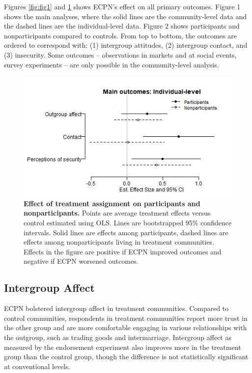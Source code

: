 \documentclass[11pt]{article}
\begin{document}
Figures \ref{fig:fig1} and \ref{fig:fig2} shows ECPN's effect on all
primary outcomes. Figure 1 shows the main analyses, where the solid
lines are the community-level data and the dashed lines are the
individual-level data. Figure 2 shows participants and nonparticipants
compared to controls. From top to bottom, the outcomes are ordered to
correspond with: (1) intergroup attitudes, (2) intergroup contact, and
(3) insecurity. Some outcomes -- observations in markets and at social
events, survey experiments -- are only possible in the community-level
analysis.

\begin{figure}[H]
\centering
\includegraphics[width=.7\textwidth]{../../../figs/ecpn_coefplots_MainOuts_panel-cats2.jpg}
\caption{\label{fig:fig2} \textbf{Effect of treatment assignment on participants and nonparticipants.} Points are average treatment effects versus control estimated using OLS. Lines are bootstrapped 95\% confidence intervals.  Solid lines are effects among participants, dashed lines are effects among nonparticipants living in treatment communities.  Effects in the figure are positive if ECPN improved outcomes and negative if ECPN worsened outcomes.}
\end{figure}

\hypertarget{intergroup-affect}{%
\subsection{Intergroup Affect}\label{intergroup-affect}}

ECPN bolstered intergroup affect in treatment communities. Compared to
control communities, respondents in treatment communities report more
trust in the other group and are more comfortable engaging in various
relationships with the outgroup, such as trading goods and
intermarriage. Intergroup affect as measured by the endorsement
experiment also improves more in the treatment group than the control
group, though the difference is not statistically significant at
conventional levels.
\end{document}
